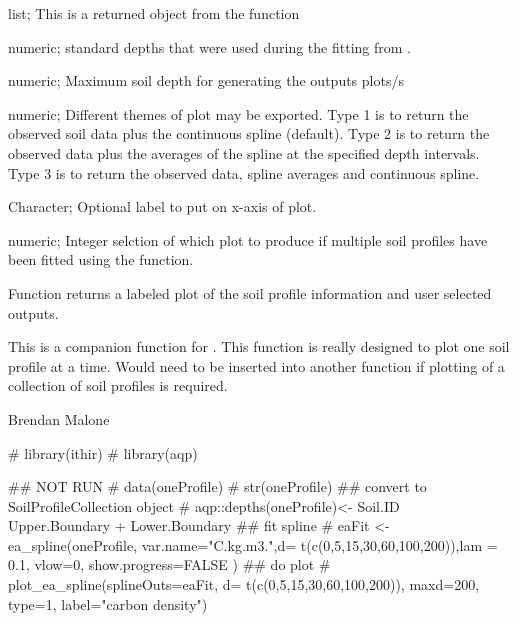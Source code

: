 \documentclass[a4paper]{book}
\begin{document}
%
\begin{Arguments}
\begin{ldescription}
\item[\code{splineOuts}] list; This is a returned object from the  function
\item[\code{d}] numeric; standard depths that were used during the fitting from .
\item[\code{maxd}] numeric; Maximum soil depth for generating the outputs plots/s
\item[\code{type}] numeric; Different themes of plot may be exported. Type 1 is to return the observed soil data plus the continuous spline (default). Type 2 is to return the observed data plus the averages of the spline at the specified depth intervals. Type 3 is to return the observed data, spline averages and continuous spline.
\item[\code{label}] Character; Optional label to put on x-axis of plot.
\item[\code{plot.which}] numeric; Integer selction of which plot to produce if multiple soil profiles have been fitted using the  function.
\end{ldescription}
\end{Arguments}
%
\begin{Value}
Function returns a labeled plot of the soil profile information and user selected  outputs.
\end{Value}
%
\begin{Note}
This is a companion function for . This function is really designed to plot one soil profile at a time. Would need to be inserted into another function if plotting of a collection of soil profiles is required.
\end{Note}
%
\begin{Author}
Brendan Malone
\end{Author}
%
\begin{Examples}
\begin{ExampleCode}

# library(ithir)
# library(aqp)
 
## NOT RUN
# data(oneProfile)
# str(oneProfile)
## convert to SoilProfileCollection object
# aqp::depths(oneProfile)<- Soil.ID ~ Upper.Boundary + Lower.Boundary
## fit spline
# eaFit <- ea_spline(oneProfile, var.name="C.kg.m3.",d= t(c(0,5,15,30,60,100,200)),lam = 0.1, vlow=0, show.progress=FALSE )
## do plot
# plot_ea_spline(splineOuts=eaFit, d= t(c(0,5,15,30,60,100,200)), maxd=200, type=1, label="carbon density") 

\end{ExampleCode}
\end{Examples}
\end{document}
